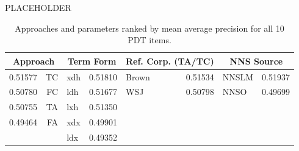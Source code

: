 \documentclass[final,t]{beamer}
\begin{document}
\begin{frame}{}
\begin{columns}[t]
\begin{column}{.64\linewidth}
\begin{columns}
\begin{column}{.49\linewidth}
\begin{block}{PLACEHOLDER}
\vspace{.2em}
\begin{table}
\begin{center}
\begin{tabular}{|l|r||l|r||l|r||l|r|}
 \hline
 \multicolumn{2}{|c||}{Approach} & \multicolumn{2}{|c||}{Term Form} & \multicolumn{2}{|c||}{Ref. Corp. (TA/TC)} & \multicolumn{2}{|c|}{NNS Source} \\
 \hline
 \hline
 0.51577 & TC & xdh & 0.51810 & Brown & 0.51534 & NNSLM & 0.51937 \\
 \hline
 0.50780 & FC & ldh & 0.51677 & WSJ & 0.50798 & NNSO & 0.49699 \\
 \hline
 0.50755 & TA & lxh & 0.51350 & & & & \\
 \hline
 0.49464 & FA & xdx & 0.49901 & & & & \\
 \hline
 & 	& ldx & 0.49352 &  &  &  & \\
 \hline
\end{tabular}
\vspace{.7em}
\caption{Approaches and parameters ranked by mean average precision for all 10 PDT items.}
\label{tab:dist-ranked-parameters}
\end{center}
\end{table}


\end{block}
\end{column}
\end{columns}
\end{column}
\end{columns}
\end{frame}
\end{document}

